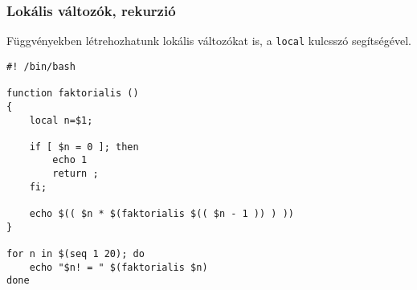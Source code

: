 \subsubsection*{Lokális változók, rekurzió}
Függvényekben létrehozhatunk lokális változókat is, a \texttt{local} kulcsszó segítségével.



\begin{lstlisting}
#! /bin/bash

function faktorialis ()
{
    local n=$1;

    if [ $n = 0 ]; then
        echo 1
        return ;
    fi;

    echo $(( $n * $(faktorialis $(( $n - 1 )) ) ))
}

for n in $(seq 1 20); do
    echo "$n! = " $(faktorialis $n)
done
\end{lstlisting}



